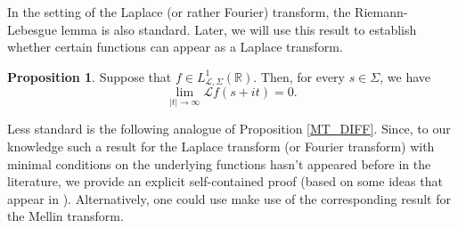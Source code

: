 \documentclass[a4paper,12pt,oneside]{article}
\theoremstyle{definition}
\newtheorem{prop}[defi]{Proposition}
\newcommand{\R}{\mathbb{R}}
\newcommand{\LT}[1]{\mathcal{L}#1}
\begin{document}
In the setting of the Laplace (or rather Fourier) transform, the Riemann-Lebesgue lemma is also standard. Later, we will use this result to establish whether certain functions can appear as a Laplace transform.

\begin{prop} \label{LT_RL}
    Suppose that $f\in L_{\LT{},\Sigma}^{1}(\R)$. Then, for every $s\in\Sigma$, we have
        $$ \lim_{|t|\to\infty} \LT{f}(s+it) = 0. $$
\end{prop}

Less standard is the following analogue of Proposition \ref{MT_DIFF}. Since, to our knowledge such a result for the Laplace transform (or Fourier transform) with minimal conditions on the underlying functions hasn't appeared before in the literature, we provide an explicit self-contained proof (based on some ideas that appear in \cite[\S 8]{BJ:MT}). Alternatively, one could use make use of the corresponding result for the Mellin transform.
\end{document}
